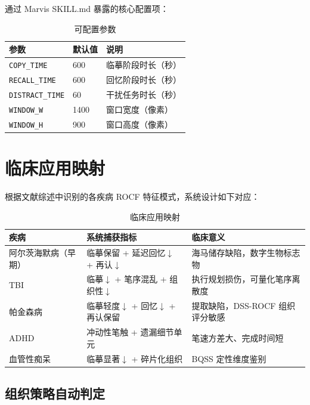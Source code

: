 \documentclass[12pt,a4paper]{ctexart}
\begin{document}
通过 Marvis SKILL.md 暴露的核心配置项：

\begin{table}[h]
\centering
\begin{tabular}{lll}
\toprule
\textbf{参数} & \textbf{默认值} & \textbf{说明} \\
\midrule
\texttt{COPY\_TIME}     & 600  & 临摹阶段时长（秒） \\
\texttt{RECALL\_TIME}   & 600  & 回忆阶段时长（秒） \\
\texttt{DISTRACT\_TIME} & 60   & 干扰任务时长（秒） \\
\texttt{WINDOW\_W}      & 1400 & 窗口宽度（像素） \\
\texttt{WINDOW\_H}      & 900  & 窗口高度（像素） \\
\bottomrule
\end{tabular}
\caption{可配置参数}
\end{table}

\section{临床应用映射}

根据文献综述中识别的各疾病 ROCF 特征模式，系统设计如下对应：

\begin{table}[h]
\centering
\begin{tabular}{p{3.8cm} p{5cm} p{5cm}}
\toprule
\textbf{疾病} & \textbf{系统捕获指标} & \textbf{临床意义} \\
\midrule
阿尔茨海默病（早期） & 临摹保留 + 延迟回忆$\downarrow$ + 再认$\downarrow$ & 海马储存缺陷，数字生物标志物 \\
TBI & 临摹$\downarrow$ + 笔序混乱 + 组织性$\downarrow$ & 执行规划损伤，可量化笔序离散度 \\
帕金森病 & 临摹轻度$\downarrow$ + 回忆$\downarrow$ + 再认保留 & 提取缺陷，DSS-ROCF 组织评分敏感 \\
ADHD & 冲动性笔触 + 遗漏细节单元 & 笔速方差大、完成时间短 \\
血管性痴呆 & 临摹显著$\downarrow$ + 碎片化组织 & BQSS 定性维度鉴别 \\
\bottomrule
\end{tabular}
\caption{临床应用映射}
\end{table}

\subsection{组织策略自动判定}
\end{document}

